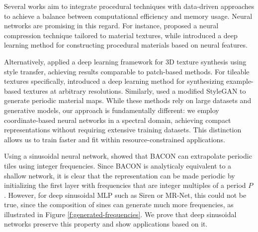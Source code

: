 
Several works aim to integrate procedural techniques with data-driven approaches to achieve a balance between computational efficiency and memory usage. Neural networks are promising in this regard. For instance, \citet{ntc2023} proposed a neural compression technique tailored to material textures, while \citet{match} introduced a deep learning method for constructing procedural materials based on neural features.

Alternatively, \citet{Gutierrez-2019} applied a deep learning framework for 3D texture synthesis using style transfer, achieving results comparable to patch-based methods. For tileable textures specifically, \citet{deeptile} introduced a deep learning method for synthesizing example-based textures at arbitrary resolutions. Similarly, \citet{zhou2022tilegen} used a modified StyleGAN to generate periodic material maps. While these methods rely on large datasets and generative models, our approach is fundamentally different: we employ coordinate-based neural networks in a spectral domain, achieving compact representations without requiring extensive training datasets. This distinction allows us to train faster and fit within resource-constrained applications.


Using a sinusoidal neural network, \citet{bacon2021} showed that BACON can extrapolate periodic tiles using integer frequencies. Since BACON is analyticaly equivalent to a shallow network, it is clear that the representation can be made periodic by initializing the first layer with frequencies that are integer multiples of a period $P$. However, for deep sinusoidal MLP such as Siren \cite{sitzmann2019siren} or MR-Net, this could not be true, since the composition of sines can generate much more frequencies, as illustrated in Figure \ref{f:generated-frequencies}. We prove that deep sinusoidal networks preserve this property and show applications based on it.


